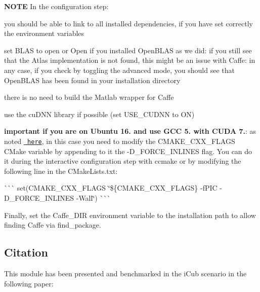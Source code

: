 {\bfseries{N\+O\+TE}} In the configuration step\+:


\begin{DoxyItemize}
\item you should be able to link to all installed dependencies, if you have set correctly the environment variables
\item set B\+L\+AS to {\ttfamily open} or {\ttfamily Open} if you installed Open\+B\+L\+AS as we did\+: if you still see that the Atlas implementation is not found, this might be an issue with Caffe\+: in any case, if you check by toggling the advanced mode, you should see that Open\+B\+L\+AS has been found in your installation directory
\item there is no need to build the Matlab wrapper for Caffe
\item use the cu\+D\+NN library if possible (set U\+S\+E\+\_\+\+C\+U\+D\+NN to ON)
\item {\bfseries{important if you are on Ubuntu 16. and use G\+CC 5. with C\+U\+DA 7.}}\+: as noted \href{https://github.com/BVLC/caffe/issues/4046}{\texttt{ here}}, in this case you need to modify the {\ttfamily C\+M\+A\+K\+E\+\_\+\+C\+X\+X\+\_\+\+F\+L\+A\+GS} C\+Make variable by appending to it the {\ttfamily -\/D\+\_\+\+F\+O\+R\+C\+E\+\_\+\+I\+N\+L\+I\+N\+ES} flag. You can do it during the interactive configuration step with {\ttfamily ccmake} or by modifying the following line in the {\ttfamily C\+Make\+Lists.\+txt}\+:

\`{}\`{}\`{} set(C\+M\+A\+K\+E\+\_\+\+C\+X\+X\+\_\+\+F\+L\+A\+GS \char`\"{}\$\{\+C\+M\+A\+K\+E\+\_\+\+C\+X\+X\+\_\+\+F\+L\+A\+G\+S\} -\/f\+P\+I\+C -\/\+D\+\_\+\+F\+O\+R\+C\+E\+\_\+\+I\+N\+L\+I\+N\+E\+S -\/\+Wall\char`\"{}) \`{}\`{}\`{}
\end{DoxyItemize}

Finally, set the {\ttfamily Caffe\+\_\+\+D\+IR} environment variable to the installation path to allow finding Caffe via {\ttfamily find\+\_\+package}.

\subsection*{Citation}

This module has been presented and benchmarked in the i\+Cub scenario in the following paper\+:

